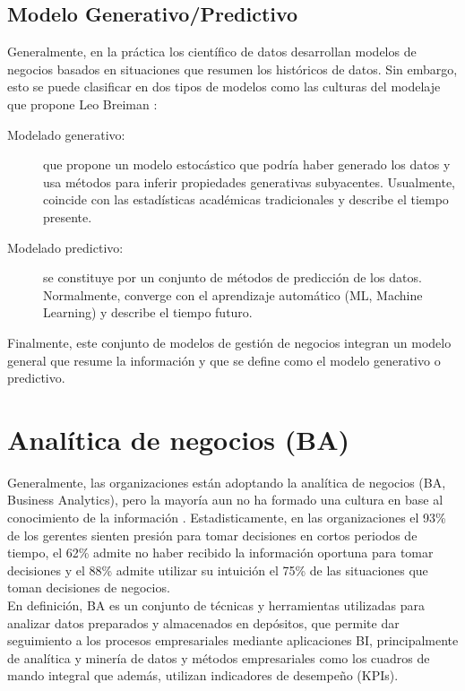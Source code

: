 \documentclass[11pt,titlepage]{report}
\begin{document}
\newpage
\subsection{Modelo Generativo/Predictivo}

Generalmente, en la práctica los científico de datos desarrollan modelos de negocios basados en situaciones que resumen los históricos de datos. Sin embargo, esto se puede clasificar en dos tipos de modelos como las culturas del modelaje que propone Leo Breiman \cite{art05}:

\begin{description}
	\item[Modelado generativo:] que propone un modelo estocástico que podría haber generado los datos y usa métodos para inferir propiedades generativas subyacentes. Usualmente, coincide con las estadísticas académicas tradicionales y  describe el tiempo presente.
	 
	\item[Modelado predictivo:] se constituye por un conjunto de métodos de predicción de los datos. Normalmente, converge con el aprendizaje automático (ML, Machine Learning) y describe el tiempo futuro.
\end{description}

Finalmente, este conjunto de modelos de gestión de negocios integran un modelo general que resume la información y que se define como el modelo generativo o predictivo.


\section{Analítica de negocios (BA)}

Generalmente, las organizaciones están adoptando la analítica de negocios (BA, Business Analytics), pero la mayoría aun no ha formado una cultura en base al conocimiento de la información \cite{art06}. Estadisticamente, en las organizaciones el 93\% de los gerentes sienten presión para tomar decisiones en cortos periodos de tiempo, el 62\% admite no haber recibido la información oportuna para tomar decisiones y el 88\% admite utilizar su intuición el 75\% de las situaciones que toman decisiones de negocios.\\

En definición, BA es un conjunto de técnicas y herramientas utilizadas para analizar datos preparados y almacenados en depósitos, que permite dar seguimiento a los procesos empresariales mediante aplicaciones BI, principalmente de analítica y minería de datos y métodos empresariales como los cuadros de mando integral que además, utilizan indicadores de desempeño (KPIs).
\end{document}
